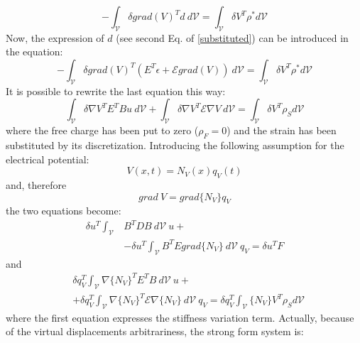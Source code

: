 \documentclass[twocolumn,a4paper,10pt,english]{article}
\begin{document}
				\begin{equation}
				-\int_{\mathcal{V}} \delta grad(V)^T d~ d\mathcal{V}=\int_{\mathcal{V}} \delta V^T \rho^* d\mathcal{V}
				\end{equation}	
				Now, the expression of $d$ (see second Eq. of \ref{substituted}) can be introduced in the equation:
				\begin{equation}
					-\int_{\mathcal{V}} \delta grad(V)^T (E^T \epsilon + \mathcal{E} grad(V))~ d\mathcal{V}=\int_{\mathcal{V}} \delta V^T \rho^* d\mathcal{V}
				\end{equation}
				It is possible to rewrite the last equation this way:
					\begin{equation}
					\int_{\mathcal{V}} \delta \nabla V^T E^T Bu~d\mathcal{V}+\int_{\mathcal{V}} \delta \nabla V^T \mathcal{E} \nabla V~ d\mathcal{V}= \int_{\mathcal{V}} \delta V^T \rho_S d\mathcal{V}
					\end{equation}
					where the free charge has been put to zero ($\rho_F=0$) and the strain has been substituted by its discretization.
					Introducing the following assumption for the electrical potential:
					\begin{equation}
						V(x,t)=N_V(x)q_V(t)
					\end{equation}
					and, therefore
					\begin{equation}
					grad~V=grad\{N_V\}q_V
					\end{equation}
					the two equations become:
					\begin{equation}\begin{split}
					\delta u^T \int_{\mathcal{V}}  &B^TDB~d\mathcal{V}~u+\\
					&-\delta u^T \int_{\mathcal{V}}  B^TEgrad\{N_V\}~d\mathcal{V}~q_V=\delta u^TF
					\end{split}
					\end{equation}
					and
					\begin{equation}\begin{split}
						&\delta q_V^T\int_{\mathcal{V}} \nabla\{N_V\}^T E^T B~d\mathcal{V}~u+\\
						&+\delta q_V^T\int_{\mathcal{V}} \nabla\{N_V\} ^T \mathcal{E} \nabla\{N_V\}~ d\mathcal{V}~q_V=
						 \delta q_V^T\int_{\mathcal{V}} \{N_V\}V^T \rho_S d\mathcal{V}	
					\end{split}
					\end{equation}
					where the first equation expresses the stiffness variation term.
					Actually, because of the virtual displacements arbitrariness, the strong form system is:
\end{document}

